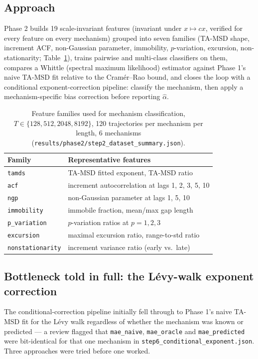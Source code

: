 \documentclass[11pt]{article}
\newcommand{\code}[1]{\texttt{#1}}
\begin{document}
\subsection{Approach}

Phase 2 builds 19 scale-invariant features (invariant under $x\mapsto cx$,
verified for every feature on every mechanism) grouped into seven families
(TA-MSD shape, increment ACF, non-Gaussian parameter, immobility, $p$-variation,
excursion, non-stationarity; Table~\ref{tab:features}), trains pairwise and
multi-class classifiers on them, compares a Whittle (spectral maximum
likelihood) estimator against Phase 1's naive TA-MSD fit relative to the
Cram\'er--Rao bound, and closes the loop with a conditional exponent-correction
pipeline: classify the mechanism, then apply a mechanism-specific bias
correction before reporting $\hat\alpha$.

\begin{table}[htbp]
\centering
\caption{Feature families used for mechanism classification, $T\in\{128,
512, 2048, 8192\}$, 120 trajectories per mechanism per length, 6 mechanisms
(\code{results/phase2/step2\_dataset\_summary.json}).}
\label{tab:features}
\begin{tabular}{ll}
\toprule
Family & Representative features \\
\midrule
\code{tamds} & TA-MSD fitted exponent, TA-MSD ratio \\
\code{acf} & increment autocorrelation at lags 1, 2, 3, 5, 10 \\
\code{ngp} & non-Gaussian parameter at lags 1, 5, 10 \\
\code{immobility} & immobile fraction, mean/max gap length \\
\code{p\_variation} & $p$-variation ratios at $p{=}1,2,3$ \\
\code{excursion} & maximal excursion ratio, range-to-std ratio \\
\code{nonstationarity} & increment variance ratio (early vs.\ late) \\
\bottomrule
\end{tabular}
\end{table}

\subsection{Bottleneck told in full: the L\'evy-walk exponent correction}
\label{sec:phase2-levy}

The conditional-correction pipeline initially fell through to Phase 1's naive
TA-MSD fit for the L\'evy walk regardless of whether the mechanism was known
or predicted --- a review flagged that \code{mae\_naive}, \code{mae\_oracle}
and \code{mae\_predicted} were bit-identical for that one mechanism in
\code{step6\_conditional\_exponent.json}. Three approaches were tried before
one worked.
\end{document}
